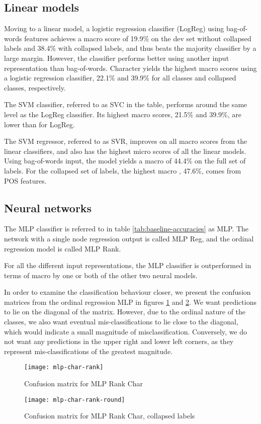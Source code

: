 \subsection{Linear models}

Moving to a linear model, a logistic regression classifier (LogReg) using
bag-of-words features achieves a macro \FI score of 19.9\% on the dev set
without collapsed labels and 38.4\% with collapsed labels, and thus beats the
majority classifier by a large margin. However, the classifier performs
better using another input representation than bag-of-words. Character
\ngrams yields the highest macro \FI scores using a logistic regression
classifier, 22.1\% and 39.9\% for all classes and collapsed classes,
respectively.

The \ac{SVM} classifier, referred to as SVC in the table, performs around the
same level as the LogReg classifier. Its highest macro \FI scores, 21.5\% and
39.9\%, are lower than for LogReg.

The \ac{SVM} regressor, referred to as SVR, improves on all macro \FI scores
from the linear classifiers, and also has the highest micro \FI scores of all
the linear models. Using bag-of-words input, the model yields a macro \FI of
44.4\% on the full set of labels. For the collapsed set of labels, the highest
macro \FI, 47.6\%, comes from POS \ngram features.


\subsection{Neural networks}

The \ac{MLP} classifier is referred to in table \ref{tab:baseline-accuracies}
as MLP. The network with a single node regression output is called MLP Reg,
and the ordinal regression model is called MLP Rank.

For all the different input representations, the \ac{MLP} classifier is
outperformed in terms of macro \FI by one or both of the other two neural
models.

In order to examine the classification behaviour closer, we present the
confusion matrices from the ordinal regression MLP in figures
\ref{fig:mlp-char-rank} and \ref{fig:mlp-char-rank-round}. We want
predictions to lie on the diagonal of the matrix. However, due to the ordinal
nature of the classes, we also want eventual mis-classifications to lie close
to the diagonal, which would indicate a small magnitude of misclassification.
Conversely, we do not want any predictions in the upper right and lower left
corners, as they represent mis-classifications of the greatest magnitude.

\begin{figure}
  \centering
  \texttt{[image: mlp-char-rank]}
  \caption{Confusion matrix for MLP Rank Char}
  \label{fig:mlp-char-rank}
\end{figure}

\begin{figure}
  \centering
  \texttt{[image: mlp-char-rank-round]}
  \caption{Confusion matrix for MLP Rank Char, collapsed labels}
  \label{fig:mlp-char-rank-round}
\end{figure}
